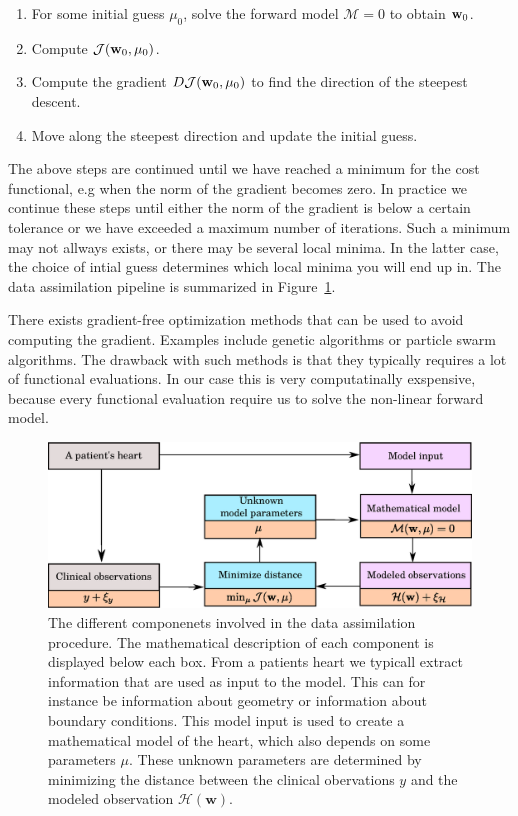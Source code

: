 \begin{enumerate}
  \item For some initial guess $\mu_0$, solve the forward model
    $\mathcal{M} = 0$ to obtain $\mathbf{w}_0$.
  \item Compute $\mathcal{J}(\mathbf{w}_0, \mu_0)$.
  \item Compute the gradient $D \mathcal{J}(\mathbf{w}_0, \mu_0)$ to find
    the direction of the steepest descent.
  \item Move along the steepest direction and update the initial guess.
\end{enumerate}
The above steps are continued until we have reached a minimum for the
cost functional, e.g when the norm of the gradient becomes zero. In
practice we continue these steps until either the norm of the
gradient is below a certain tolerance or we have exceeded a maximum
number of iterations. Such a minimum may not allways exists, or there
may be several local minima. In the latter case, the choice of intial
guess determines which local minima you will end up in. The data
assimilation pipeline is summarized in
Figure~\ref{fig:data_assimilation}.

\begin{remark}
  There exists gradient-free optimization methods that can be used to
  avoid computing the gradient. Examples include genetic algorithms or
  particle swarm algorithms. The drawback with such methods is that
  they typically requires a lot of functional evaluations. In our
  case this is very computatinally exspensive, because every functional
  evaluation require us to solve the non-linear forward model. 
\end{remark}


\begin{figure}[htbp]
  \centering
    \includegraphics[width=\textwidth]{chapters/introduction/figures/data_assimilation.eps}
\caption{The different componenets involved in the data assimilation
  procedure. The mathematical description of each component is
  displayed below each box. From a patients heart we typicall extract information
  that are used as input to the model. This can for instance be
  information about geometry or information about boundary
  conditions. This model input is used to create a mathematical model
  of the heart, which also depends on some parameters $\mu$.
  These unknown parameters are determined by minimizing the distance
  between the clinical obervations $y$ and the modeled observation
  $\mathcal{H}(\mathbf{w})$.}
\label{fig:data_assimilation}
\end{figure}

